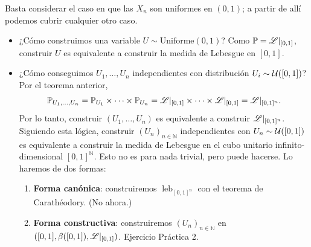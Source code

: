 \begin{eg}
    Basta considerar el caso en que las \(X_n\) son uniformes en \((0,1)\); a partir de allí podemos cubrir cualquier otro caso.
\end{eg}

\begin{itemize}
	\item ¿Cómo construimos una variable \(U \sim \text{Uniforme}(0,1)\)? Como \(\mathbb{P} = \mathscr{L}|_{[0,1]}\), construir \(U\) es equivalente a construir la medida de Lebesgue en \([0,1]\).

	\item ¿Cómo conseguimos \(U_1,\dots,U_n\) independientes con distribución \(U_{i} \sim \mathcal{U}([0,1])\)? Por el teorema anterior,
	\[
	\mathbb{P}_{U_1,\dots,U_n} = \mathbb{P}_{U_1} \times \cdots \times \mathbb{P}_{U_n} = \mathscr{L}|_{[0,1]} \times \cdots \times \mathscr{L}|_{[0,1]} = \mathscr{L}|_{[0,1]^{n}}.
	\]
	Por lo tanto, construir \((U_1,\dots,U_n)\) es equivalente a construir $\mathscr{L}|_{[0,1]^{n}}$. Siguiendo esta lógica, construir \((U_n)_{n\in\mathbb{N}}\) independientes con \(U_n \sim \mathcal{U}([0,1])\) es equivalente a construir la medida de Lebesgue en el cubo unitario infinito-dimensional \([0,1]^{\mathbb{N}}\). Esto no es para nada trivial, pero puede hacerse. Lo haremos de dos formas:
    \begin{enumerate}
        \item \textbf{Forma canónica}: construiremos \(\operatorname{leb}_{[0,1]^n}\) con el teorema de Carathéodory. (No ahora.)
		\item \textbf{Forma constructiva}: construiremos \((U_n)_{n\in\mathbb{N}}\) en \(([0,1], \beta([0,1]), \mathscr{L}|_{[0,1]})\). Ejercicio Práctica 2.
    \end{enumerate}
\end{itemize}
